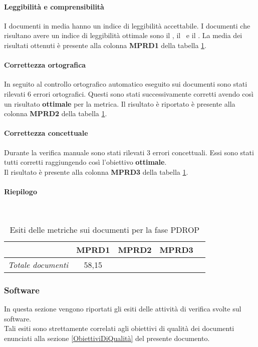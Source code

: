 \documentclass[../PianoDiQualifica.tex]{subfiles}
\begin{document}
\begin{appendices}
			\paragraph{Leggibilità e comprensibilità}
			I documenti in media hanno un indice di leggibilità accettabile. I documenti che risultano avere un indice di leggibilità ottimale sono il \glossario, il \manualeutente\ e il \manualesviluppatore.
			La media dei risultati ottenuti è presente alla colonna \textbf{MPRD1} della tabella \ref{tab:esiti_metriche_sui_documenti}. 
			
			\paragraph{Correttezza ortografica}
			In seguito al controllo ortografico automatico eseguito sui documenti sono stati rilevati 6 errori ortografici. Questi sono stati successivamente corretti avendo così un risultato \textbf{ottimale} per la metrica.
			Il risultato è riportato è presente alla colonna \textbf{MPRD2} della tabella \ref{tab:esiti_metriche_sui_documenti}.  
			
			
			\paragraph{Correttezza concettuale}
			 Durante la verifica manuale sono stati rilevati 3 errori concettuali. Essi sono stati tutti corretti raggiungendo così l'obiettivo \textbf{ottimale}.\\
			 Il risultato è presente alla colonna \textbf{MPRD3} della tabella \ref{tab:esiti_metriche_sui_documenti}.  
			
			\paragraph{Riepilogo}\
			\begin{table}[H]
				\centering
				\begin{tabular}{l * {4}{c}}
					\toprule
					  & \textbf{MPRD1} & \textbf{MPRD2} & \textbf{MPRD3}\\
					\midrule
					\textit{Totale documenti} & 58,15 & \color{dkgreen}{0\%} & \color{dkgreen}{0\%} \\
					\bottomrule
				\end{tabular}
				\caption{Esiti delle metriche sui documenti per la fase PDROP}
				\label{tab:esiti_metriche_sui_documenti}
			\end{table}
			
			
		\subsubsection{Software}
		In questa sezione vengono riportati gli esiti delle attività di verifica svolte sul software.\\
		Tali esiti sono strettamente correlati agli obiettivi di qualità dei documenti enunciati alla sezione \ref{ObiettiviDiQualità} del presente documento.
		

\end{appendices}
\end{document}
